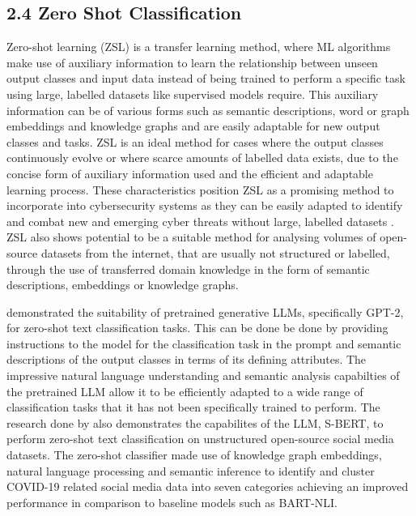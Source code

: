 \documentclass[letterpaper,twocolumn,fleqn]{article}
\begin{document}
\subsection{2.4 Zero Shot Classification}
Zero-shot learning (ZSL) is a transfer learning method, where ML algorithms make use of auxiliary information to learn the relationship between unseen output classes and input data instead of being trained to perform a specific task using large, labelled datasets like supervised models require\cite{wangSurveyZeroShotLearning2019,zhangIntegratingSemanticKnowledge2019,pushpTrainOnceTest2017}.
This auxiliary information can be of various forms such as semantic descriptions, word or graph embeddings and knowledge graphs and are easily adaptable for new output classes and tasks\cite{wangSurveyZeroShotLearning2019,pushpTrainOnceTest2017}. ZSL is an ideal method for cases where the output classes continuously evolve or where scarce amounts of labelled data exists, due to the concise form of auxiliary information used and the efficient and adaptable learning process\cite{wangSurveyZeroShotLearning2019,zhangIntegratingSemanticKnowledge2019,pushpTrainOnceTest2017}. 
These characteristics position ZSL as a promising method to incorporate into cybersecurity systems as they can be easily adapted to identify and combat new and emerging cyber threats without large, labelled datasets \cite{zhangUnknownAttackDetection2020,zerhoudiImprovingIntrusionDetection2020,barrosMalwareSMELLZeroshotLearning2022,chenZeroShotTextClassification2022, wangSurveyZeroShotLearning2019}.
ZSL also shows potential to be a suitable method for analysing volumes of open-source datasets from the internet, that are usually not structured or labelled, through the use of transferred domain knowledge in the form of semantic descriptions, embeddings or knowledge graphs\cite{chenZeroShotTextClassification2022,puriZeroshotTextClassification2019,pushpTrainOnceTest2017,wangSurveyZeroShotLearning2019,zhangIntegratingSemanticKnowledge2019}. 

\cite{puriZeroshotTextClassification2019} demonstrated the suitability of pretrained generative LLMs, specifically GPT-2, for zero-shot text classification tasks. This can be done be done by providing instructions to the model for the classification task in the prompt and semantic descriptions of the output classes in terms of its defining attributes\cite{puriZeroshotTextClassification2019}. 
The impressive natural language understanding and semantic analysis capabilties of the pretrained LLM allow it to be efficiently adapted to a wide range of classification tasks that it has not been specifically trained to perform\cite{puriZeroshotTextClassification2019,chenZeroShotTextClassification2022}.
The research done by \cite{chenZeroShotTextClassification2022} also demonstrates the capabilites of the LLM, S-BERT, to perform zero-shot text classification on unstructured open-source social media datasets. The zero-shot classifier made use of knowledge graph embeddings, natural language processing and semantic inference to identify and cluster COVID-19 related social media data into seven categories achieving an improved performance in comparison to baseline models such as BART-NLI\cite{chenZeroShotTextClassification2022}.  
\end{document}
